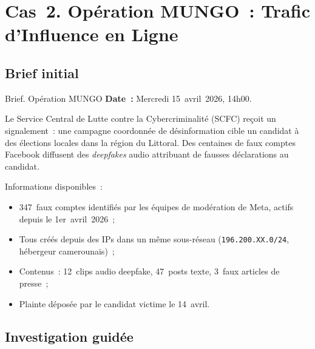 \section{Cas~2. Opération MUNGO~: Trafic d'Influence en Ligne}
\label{sec:cas-mungo}

\subsection{Brief initial}

\begin{boxscenario}{Brief. Opération MUNGO}
\textbf{Date~:} Mercredi 15~avril~2026, 14h00.

Le Service Central de Lutte contre la Cybercriminalité (SCFC) reçoit
un signalement~: une campagne coordonnée de désinformation cible un
candidat à des élections locales dans la région du Littoral. Des
centaines de faux comptes Facebook diffusent des \textit{deepfakes}
audio attribuant de fausses déclarations au candidat.

Informations disponibles~:
\begin{itemize}
    \item 347~faux comptes identifiés par les équipes de modération
          de Meta, actifs depuis le 1er~avril~2026~;
    \item Tous créés depuis des IPs dans un même sous-réseau
          (\texttt{196.200.XX.0/24}, hébergeur camerounais)~;
    \item Contenus~: 12~clips audio deepfake, 47~posts texte,
          3~faux articles de presse~;
    \item Plainte déposée par le candidat victime le 14~avril.
\end{itemize}
\end{boxscenario}

\subsection{Investigation guidée}

